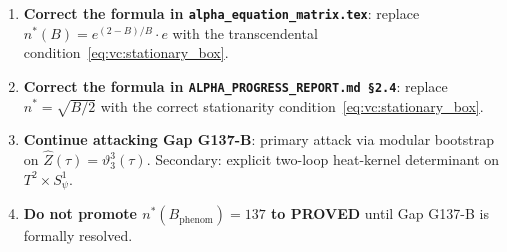 \documentclass[12pt,a4paper]{article}
\theoremstyle{definition}
\theoremstyle{remark}
\begin{document}
\begin{enumerate}
  \item \textbf{Correct the formula in \texttt{alpha\_equation\_matrix.tex}}:
        replace $n^*(B) = e^{(2-B)/B}\cdot e$ with the transcendental
        condition~\eqref{eq:vc:stationary_box}.

  \item \textbf{Correct the formula in \texttt{ALPHA\_PROGRESS\_REPORT.md~\S2.4}}:
        replace $n^* = \sqrt{B/2}$ with the correct stationarity
        condition~\eqref{eq:vc:stationary_box}.

  \item \textbf{Continue attacking Gap G137-B}:
        primary attack via modular bootstrap on $\hat{Z}(\tau) = \vartheta_3^3(\tau)$.
        Secondary: explicit two-loop heat-kernel determinant on $T^2\times S^1_\psi$.

  \item \textbf{Do not promote $n^*(B_{\mathrm{phenom}}) = 137$ to PROVED}
        until Gap G137-B is formally resolved.
\end{enumerate}

\ifdefined\INCLUDEMODE
\else
  
\end{document}
